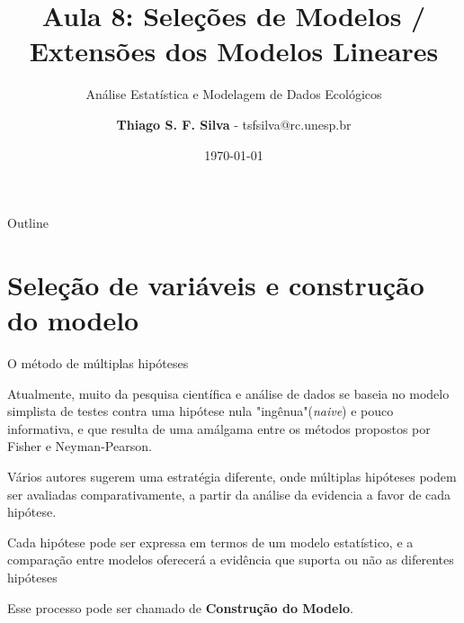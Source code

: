 \documentclass{beamer}\usepackage[]{graphicx}\usepackage[]{color}
\title{Aula 8: Seleções de Modelos / Extensões dos Modelos Lineares}
\subtitle{Análise Estatística e Modelagem de Dados Ecológicos}
\author{\textbf{Thiago S. F. Silva} - tsfsilva@rc.unesp.br}
\institute{Programa de Pós Graduação em Ecologia e Biodiversidade - UNESP}
\date{\today}
\begin{document}
\begin{frame}[plain] %
  \titlepage
\end{frame}

\begin{frame}{Outline}
  \tableofcontents
\end{frame}

\section{Seleção de variáveis e construção do modelo}


\begin{frame}{O método de múltiplas hipóteses}
\begin{small}

Atualmente, muito da pesquisa científica e análise de dados se baseia no modelo simplista de testes contra uma hipótese nula "ingênua"(\emph{naive}) e pouco informativa, e que resulta de uma amálgama entre os métodos propostos por Fisher e Neyman-Pearson. 

\vfill

Vários autores sugerem uma estratégia diferente, onde múltiplas hipóteses podem ser avaliadas comparativamente, a partir da análise da evidencia a favor de cada hipótese.

\vfill

Cada hipótese pode ser expressa em termos de um modelo estatístico, e a comparação entre modelos oferecerá a evidência que suporta ou não as diferentes hipóteses

\vfill

Esse processo pode ser chamado de \textbf{Construção do Modelo}.

\end{small}
\end{frame}
\end{document}
